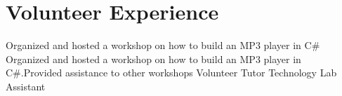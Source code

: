 \section{Volunteer Experience}
		{\newline Organized and hosted a workshop on how to build an MP3 player in C\#}
		{}{}
		{\newline Organized and hosted a workshop on how to build an MP3 player in C\#.\newline Provided assistance to other workshops}
		{}{}
		{\newline Volunteer Tutor}
		{}{}
		{\newline Technology Lab Assistant}
		{}{}